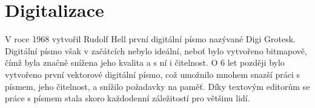 \documentclass[a4paper, 11pt]{article}
\begin{document}
\section{Digitalizace}
V roce 1968 vytvořil Rudolf Hell první digitální písmo nazývané Digi Grotesk. Digitální písmo však v 
začátcích nebylo ideální, neboť bylo vytvořeno bitmapově, čímž byla značně snížena jeho kvalita a s ní 
i čitelnost. O 6 let později bylo vytvořeno první vektorové digitální písmo, což umožnilo mnohem snazší práci
s písmem, jeho čitelnost, a snížilo požadavky na paměť. Díky textovým editorům se práce s písmem stala skoro
každodenní záležitostí pro většinu lidí\cite{bigelow1983}\cite{plna2006}.

\newpage

\renewcommand{\refname}{Literatura}

\end{document}
